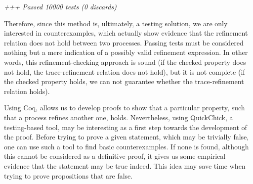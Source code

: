 \begin{tabbing}
	\emph{+++ Passed 10000 tests (0 discards)}
\end{tabbing}

Therefore, since this method is, ultimately, a testing solution, we are only interested in counterexamples, which actually show evidence that the refinement relation does not hold between two processes. Passing tests must be considered nothing but a mere indication of a possibly valid refinement expression. In other words, this refinement-checking approach is sound (if the checked property does not hold, the trace-refinement relation does not hold), but it is not complete (if the checked property holds, we can not guarantee whether the trace-refinement relation holds).

Using Coq, allows us to develop proofs to show that a particular property, such that a process refines another one, holds. Nevertheless, using QuickChick, a testing-based tool, may be interesting as a first step towards the development of the proof. Before trying to prove a given statement, which may be trivially false, one can use such a tool to find basic counterexamples. If none is found, although this cannot be considered as a definitive proof, it gives us some empirical evidence that the statement may be true indeed. This idea may save time when trying to prove propositions that are false.